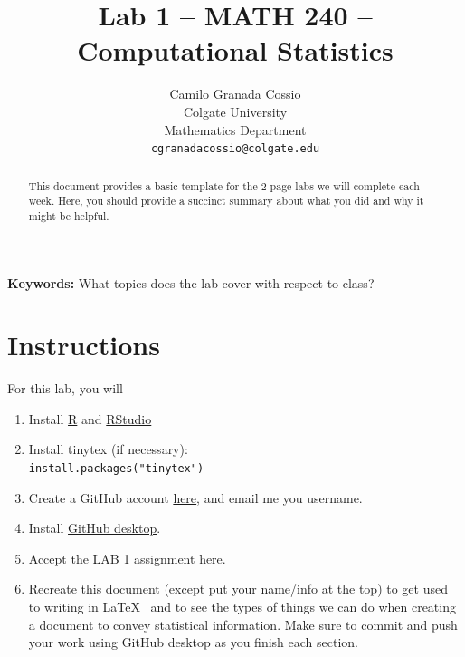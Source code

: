 \documentclass{article}\usepackage[]{graphicx}\usepackage[]{xcolor}
\begin{document}
\vspace{-1in}
\title{Lab 1 -- MATH 240 -- Computational Statistics}

\author{
  Camilo Granada Cossio \\
  Colgate University \\
  Mathematics Department  \\
  {\tt cgranadacossio@colgate.edu}
}

\date{}

\maketitle

\begin{multicols}{2}
\begin{abstract}
This document provides a basic template for the 2-page labs we will complete each week. Here, you should provide a succinct summary about what you did and why it might be helpful.
\end{abstract}

\textbf{Keywords:} What topics does the lab cover with respect to class?

\section{Instructions}
For this lab, you will
\begin{enumerate}[1.]\itemsep0em
\item Install \href{https://cran.rstudio.com/} R and \href{https://posit.co/download/rstudio-desktop/} {RStudio}
\item Install tinytex (if necessary):\\
\texttt{install.packages("tinytex")}
\item Create a GitHub account \href{https://github.com/} {here}, and email me you username.
\item Install \href{https://github.com/apps/desktop} {GitHub desktop}.
\item Accept the LAB 1 assignment \href{https://classroom.github.com/assignment-invitations/49ec7c38806e92bfef8bf3094b9b11d3} {here}.
\item Recreate this document (except put your name/info at
the top) to get used to writing in \LaTeX~ and to see the
types of things we can do when creating a document
to convey statistical information. Make sure to commit
and push your work using GitHub desktop as you finish
each section.
\end{enumerate}


\end{multicols}
\end{document}
